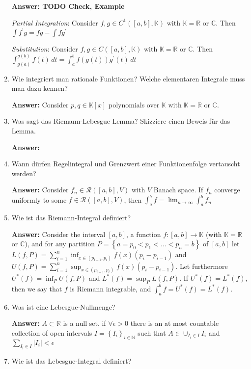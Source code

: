 \documentclass[11pt]{article}
\newcommand{\abs}[1]{\left|#1\right|}
\newcommand{\RR}[0]{\mathbb{R}}
\newcommand{\CC}[0]{\mathbb{C}}
\newcommand{\NN}[0]{\mathbb{N}}
\newcommand{\KK}[0]{\mathbb{K}}
\begin{document}
\begin{enumerate}
    \textbf{Answer: TODO Check, Example}

    \textit{Partial Integration}: Consider $f, g \in C^1([a, b], \KK)$ with $\KK = \RR$ or $\CC$. Then $\int f^\prime g = f g - \int f g^\prime$

    \textit{Substitution}: Consider $f, g \in C([a, b], \KK)$ with $\KK = \RR$ or $\CC$. Then $\int_{g(a)}^{g(b)} f(t)\,dt = \int_a^b f(g(t)) g^\prime(t) \,dt$

    \item Wie integriert man rationale Funktionen? Welche elementaren Integrale muss man dazu kennen?

    \textbf{Answer:} Consider $p, q \in \KK\left[x\right]$ polynomials over $\KK$ with $\KK = \RR$ or $\CC$.
    \item Was sagt das Riemann-Lebesgue Lemma? Skizziere einen Beweis für das Lemma.

    \textbf{Answer:}
    \item Wann dürfen Regelintegral und Grenzwert einer Funktionenfolge vertauscht werden?

    \textbf{Answer:} Consider $f_n \in \mathcal{R}([a, b], V)$ with $V$ Banach space. If $f_n$ converge uniformly to some $f\in \mathcal{R}([a, b], V)$, then $\int_a^b f = \lim_{n \to \infty} \int_a^b f_n$

    \item Wie ist das Riemann-Integral definiert?

    \textbf{Answer:} Consider the interval $[a, b]$, a function $f\colon [a, b] \to \KK$ (with $\KK = \RR$ or $\CC$), and for any partition $P = \left\{a = p_0 < p_1 < \dots < p_n = b\right\}$ of $[a, b]$ let $L(f, P) = \sum_{i = 1}^n \inf_{x \in (p_{i-1}, p_i)}f(x) (p_i - p_{i-1})$ and $U(f, P) = \sum_{i = 1}^n \sup_{x \in (p_{i-1}, p_i)}f(x) (p_i - p_{i-1})$. Let furthermore $U^*(f) = \inf_{P} U(f, P)$ and $L^*(f) = \sup_{P} L(f, P)$. If $U^*(f) = L^*(f)$, then we say that $f$ is Riemann integrable, and $\int_a^b f = U^*(f) = L^*(f)$.

    \item Was ist eine Lebesgue-Nullmenge?

    \textbf{Answer:} $A \subset \RR$ is a null set, if $\forall \epsilon > 0$ there is an at most countable collection of open intervals $I = \left\{I_i\right\}_{i \in \NN}$ such that $A \in \cup_{I_i \in I} I_i$ and $\sum_{I_i \in I} \abs{I_i} < \epsilon$

    \item Wie ist das Lebesgue-Integral definiert?



\end{enumerate}
\end{document}
